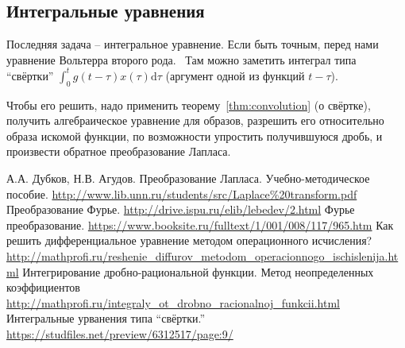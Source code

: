 \documentclass[12pt]{report}
\newcommand{\rd}{\mathrm d}
\begin{document}
\subsection{Интегральные уравнения}
Последняя задача -- интегральное уравнение. Если быть точным, перед нами уравнение Вольтерра второго рода.~\cite[см.~ф-лу~8.11]{integral-equations} Там можно заметить интеграл типа ``свёртки'' $\int_0^t g(t-\tau)x(\tau)\rd\tau$ (аргумент одной из функций $t-\tau$).

Чтобы его решить, надо применить теорему~\ref{thm:convolution} (о свёртке), получить алгебраическое уравнение для образов, разрешить его относительно образа искомой функции, по возможности упростить получившуюся дробь, и произвести обратное преобразование Лапласа.

\begin{thebibliography}{0}
	А.А. Дубков, Н.В. Агудов. Преобразование Лапласа. Учебно-методическое пособие.
	\url{http://www.lib.unn.ru/students/src/Laplace%20transform.pdf}
	Преобразование Фурье.
	\url{http://drive.ispu.ru/elib/lebedev/2.html}
	Фурье преобразование.
	\url{https://www.booksite.ru/fulltext/1/001/008/117/965.htm}
	Как решить дифференциальное уравнение
	методом операционного исчисления?
	\url{http://mathprofi.ru/reshenie_diffurov_metodom_operacionnogo_ischislenija.html}
	Интегрирование дробно-рациональной функции. 
	Метод неопределенных коэффициентов
	\url{http://mathprofi.ru/integraly_ot_drobno_racionalnoj_funkcii.html}
	Интегральные урванения типа ``свёртки.''
	\url{https://studfiles.net/preview/6312517/page:9/}
\end{thebibliography}
\end{document}
